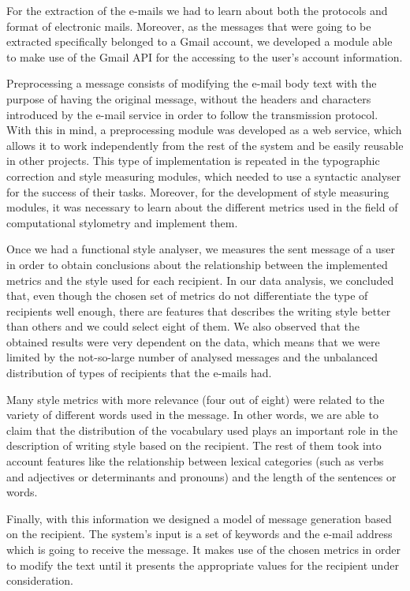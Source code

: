 For the extraction of the e-mails we had to learn about both the protocols and format of electronic mails. Moreover, as the messages that were going to be extracted specifically belonged to a Gmail account, we developed a module able to make use of the Gmail API for the accessing to the user's account information.

Preprocessing a message consists of modifying the e-mail body text with the purpose of having the original message, without the headers and characters introduced by the e-mail service in order to follow the transmission protocol. With this in mind, a preprocessing module was developed as a web service, which allows it to work independently from the rest of the system and be easily reusable in other projects. This type of implementation is repeated in the typographic correction and style measuring modules, which needed to use a syntactic analyser for the success of their tasks. Moreover, for the development of style measuring modules, it was necessary to learn about the different metrics used in the field of computational stylometry and implement them.

Once we had a functional style analyser, we measures the sent message of a user in order to obtain conclusions about the relationship between the implemented metrics and the style used for each recipient. In our data analysis, we concluded that, even though the chosen set of metrics do not differentiate the type of recipients well enough, there are features that describes the writing style better than others and we could select eight of them. We also observed that the obtained results were very dependent on the data, which means that we were limited by the not-so-large number of analysed messages and the unbalanced distribution of types of recipients that the e-mails had.

Many style metrics with more relevance (four out of eight) were related to the variety of different words used in the message. In other words, we are able to claim that the distribution of the vocabulary used plays an important role in the description of writing style based on the recipient. The rest of them took into account features like the relationship between lexical categories (such as verbs and adjectives or determinants and pronouns) and the length of the sentences or words.

Finally, with this information we designed a model of message generation based on the recipient. The system's input is a set of keywords and the e-mail address which is going to receive the message. It makes use of the chosen metrics in order to modify the text until it presents the appropriate values for the recipient under consideration.

